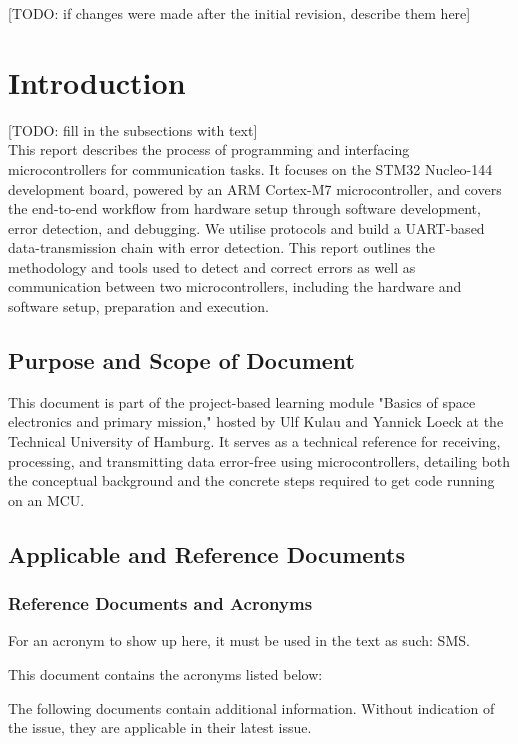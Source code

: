 \documentclass{scrartcl}
\newcommand{\TODO}[1]{{\color{red} [TODO: #1]}}
\begin{document}
\TODO{if changes were made after the initial revision, describe them here}


\section{Introduction}
\TODO{fill in the subsections with text}\\
This report describes the process of programming and interfacing microcontrollers for communication tasks. It focuses on the STM32 Nucleo-144 development board, powered by an ARM Cortex-M7 microcontroller, and covers the end-to-end workflow from hardware setup through software development, error detection, and debugging. We utilise protocols and build a \gls{UART}-based data-transmission chain with error detection. This report outlines the methodology and tools used to detect and correct errors as well as communication between two microcontrollers, including the hardware and software setup, preparation and execution.

\subsection{Purpose and Scope of Document}

This document is part of the project-based learning module "Basics of space electronics and primary mission," hosted by Ulf Kulau and Yannick Loeck at the Technical University of Hamburg. It serves as a technical reference for receiving, processing, and transmitting data error-free using microcontrollers, detailing both the conceptual background and the concrete steps required to get code running on an \gls{MCU}. 

\subsection{Applicable and Reference Documents}

\subsubsection{Reference Documents and Acronyms}
For an acronym to show up here, it must be used in the text as such: \gls{SMS}.

This document contains the acronyms listed below:
\printnoidxglossary[type=\acronymtype]

The following documents contain additional information. Without indication of the issue, they are applicable in their latest issue.


\end{document}
